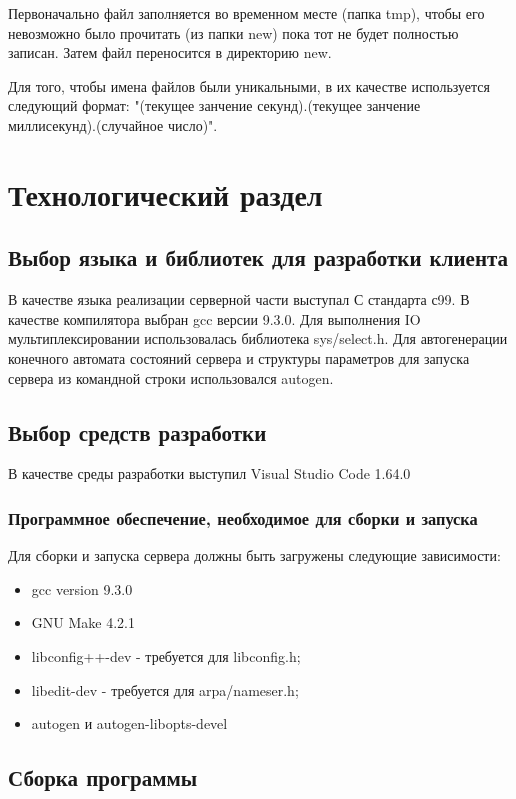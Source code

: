 \documentclass[a4paper,12pt]{report}
\begin{document}
Первоначально файл заполняется во временном месте (папка tmp), чтобы его невозможно было прочитать (из папки new) пока тот не будет полностью записан. Затем файл переносится в директорию new. 

Для того, чтобы имена файлов были уникальными, в их качестве используется следующий формат: "(текущее занчение секунд).(текущее занчение миллисекунд).(случайное число)".



\chapter{Технологический раздел}

\section{Выбор языка и библиотек для разработки клиента}
В качестве языка реализации серверной части выступал С стандарта с99. В качестве компилятора выбран gcc версии 9.3.0. Для выполнения IO мультиплексировании использовалась библиотека sys/select.h. Для автогенерации конечного автомата состояний сервера и структуры параметров для запуска сервера из командной строки использовался autogen.

\section{Выбор средств разработки}
В качестве среды разработки выступил Visual Studio Code 1.64.0

\subsection{Программное обеспечение, необходимое для сборки и запуска}
Для сборки и запуска сервера должны быть загружены следующие зависимости:

\begin{itemize} 
    \item gcc version 9.3.0
    \item GNU Make 4.2.1
    \item libconfig++-dev - требуется для libconfig.h;
    \item libedit-dev - требуется для arpa/nameser.h;
    \item autogen и autogen-libopts-devel
\end{itemize} 

\section{Сборка программы}
\end{document}
